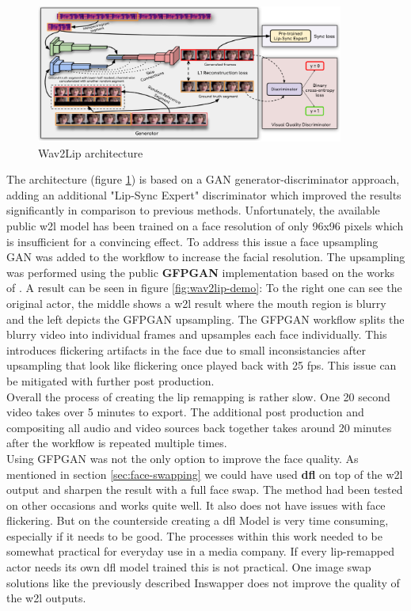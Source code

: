 \documentclass[
  a4paper,  %
  twoside,  %
  bibliography=totoc,
  headsepline,
  cleardoublepage=empty,
  parskip=half,
  draft=false
]{scrbook}
\begin{document}
\begin{figure}[h]
  \centering
  \includegraphics[width=0.9\textwidth]{./graphics/images/w2l-arch.png}
  \caption{Wav2Lip architecture}
  \label{fig:wav2lip-arch}
\end{figure}

The architecture (figure \ref{fig:wav2lip-arch}) is based on a GAN generator-discriminator approach, adding an additional "Lip-Sync Expert" discriminator which improved the results significantly in comparison to previous methods.
Unfortunately, the available public \gls{w2l} model has been trained on a face resolution of only 96x96 pixels which is insufficient for a convincing effect. To address this issue a face upsampling GAN was added to the workflow to increase the facial resolution. The upsampling was performed using the public \textbf{GFPGAN} implementation based on the works of \citet{wangNeuralSourcefilterbasedWaveform2019}. A result can be seen in figure \ref{fig:wav2lip-demo}: To the right one can see the original actor, the middle shows a \gls{w2l} result where the mouth region is blurry and the left depicts the GFPGAN upsampling. The GFPGAN workflow splits the blurry video into individual frames and upsamples each face individually. This introduces flickering artifacts in the face due to small inconsistancies after upsampling that look like flickering once played back with 25 \gls{fps}. This issue can be mitigated with further post production. \\
Overall the process of creating the lip remapping is rather slow. One 20 second video takes over 5 minutes to export. The additional post production and compositing all audio and video sources back together takes around 20 minutes after the workflow is repeated multiple times. \\
Using GFPGAN was not the only option to improve the face quality. As mentioned in section \ref{sec:face-swapping} we could have used \textbf{\gls{dfl}} on top of the \gls{w2l} output and sharpen the result with a full face swap. The method had been tested on other occasions and works quite well. It also does not have issues with face flickering. But on the counterside creating a \gls{dfl} Model is very time consuming, especially if it needs to be good. The processes within this work needed to be somewhat practical for everyday use in a media company. If every lip-remapped actor needs its own \gls{dfl} model trained this is not practical. One image swap solutions like the previously described Inswapper does not improve the quality of the \gls{w2l} outputs. \\
\end{document}
